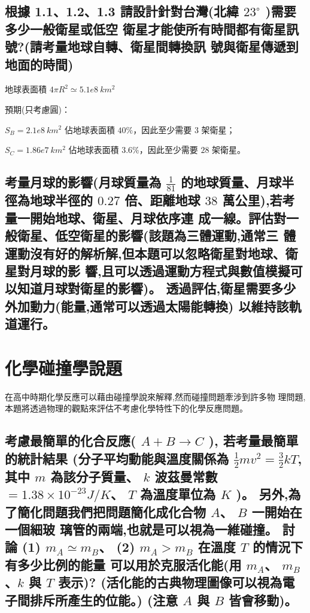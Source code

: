 \documentclass[UTF8,a4paper,12pt]{article}
\begin{document}
\subsection{根據 1.1、1.2、1.3 請設計針對台灣(北緯 \texorpdfstring{$ 23^\circ $}{23} )需要多少一般衛星或低空
衛星才能使所有時間都有衛星訊號?(請考量地球自轉、衛星間轉換訊
號與衛星傳遞到地面的時間)}

地球表面積 $4 \pi R^2 \simeq 5.1e8\ km^2$

預期(只考慮圓)：

$S_B = 2.1e8\ km^2 $ 佔地球表面積 $40\%$，因此至少需要 $3$ 架衛星；

$S_C = 1.86e7\ km^2$ 佔地球表面積 $3.6\%$，因此至少需要 $28$ 架衛星。

\subsection{考量月球的影響(月球質量為 \texorpdfstring{$\frac{1}{81}$}{1/81} 的地球質量、月球半徑為地球半徑的
\texorpdfstring{$0.27$}{0.27} 倍、距離地球 \texorpdfstring{$38$}{38} 萬公里),若考量一開始地球、衛星、月球依序連
成一線。評估對一般衛星、低空衛星的影響(該題為三體運動,通常三
體運動沒有好的解析解,但本題可以忽略衛星對地球、衛星對月球的影
響,且可以透過運動方程式與數值模擬可以知道月球對衛星的影響)。
透過評估,衛星需要多少外加動力(能量,通常可以透過太陽能轉換)
以維持該軌道運行。}

\section{化學碰撞學說題}

在高中時期化學反應可以藉由碰撞學說來解釋,然而碰撞問題牽涉到許多物
理問題,本題將透過物理的觀點來評估不考慮化學特性下的化學反應問題。

\subsection{考慮最簡單的化合反應( \texorpdfstring{$A + B \rightarrow C$}{A+B -> C} ), 若考量最簡單的統計結果
(分子平均動能與溫度關係為 \texorpdfstring{$\frac{1}{2} mv^2 = \frac{3}{2} kT$}{1/2 mv2 = 3/2 kT},
其中 \texorpdfstring{$m$}{m} 為該分子質量、
\texorpdfstring{$k$}{k} 波茲曼常數 \texorpdfstring{$ = 1.38 \times 10^{-23} J/K$}{=1.38*10-23 J/K}、
\texorpdfstring{$T$}{T} 為溫度單位為 \texorpdfstring{$K$}{K} )。
另外,為了簡化問題我們把問題簡化成化合物 \texorpdfstring{$A$}{A}、
\texorpdfstring{$B$}{B} 一開始在一個細玻
璃管的兩端,也就是可以視為一維碰撞。
討論 (1) \texorpdfstring{$m_A \simeq m_B$}{mA ≈ mB}、
(2) \texorpdfstring{$m_A > m_B$}{mA>mB} 在溫度 \texorpdfstring{$T$}{T}
的情況下有多少比例的能量
可以用於克服活化能(用 \texorpdfstring{$m_A$}{mA}、
\texorpdfstring{$m_B$}{mB}、\texorpdfstring{$k$}{k} 與 \texorpdfstring{$T$}{T} 表示)?
(活化能的古典物理圖像可以視為電子間排斥所產生的位能。)
(注意 \texorpdfstring{$A$}{A} 與 \texorpdfstring{$B$}{B} 皆會移動)。}
\end{document}
